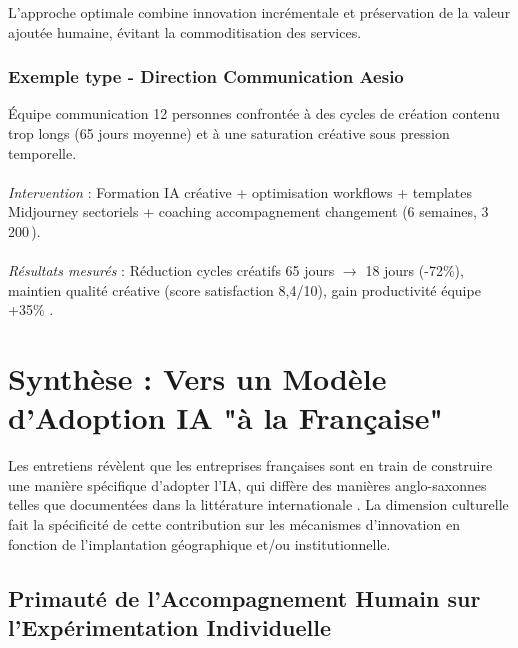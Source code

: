 L'approche optimale combine innovation incrémentale et préservation de la valeur ajoutée humaine, évitant la commoditisation des services.

\subsubsection{Exemple type - Direction Communication Aesio}
Équipe communication 12 personnes confrontée à des cycles de création contenu trop longs (65 jours moyenne) et à une saturation créative sous pression temporelle.
\\\\
\emph{Intervention} : Formation IA créative + optimisation workflows + templates Midjourney sectoriels + coaching accompagnement changement (6 semaines, 3\,200\,\texteuro{}).
\\\\
\emph{Résultats mesurés} : Réduction cycles créatifs 65 jours $\rightarrow$ 18 jours (-72\%), maintien qualité créative (score satisfaction 8{,}4/10), gain productivité équipe +35\% \cite{luwai2025aesio}.

\section{Synthèse : Vers un Modèle d'Adoption IA "à la Française"}

Les entretiens révèlent que les entreprises françaises sont en train de construire une manière spécifique d'adopter l'IA, qui diffère des manières anglo-saxonnes telles que documentées dans la littérature internationale \cite{rogers2003diffusion,moore2014crossing}. La dimension culturelle fait la spécificité de cette contribution sur les mécanismes d'innovation en fonction de l'implantation géographique et/ou institutionnelle.


\subsection{Primauté de l'Accompagnement Humain sur l'Expérimentation Individuelle}

